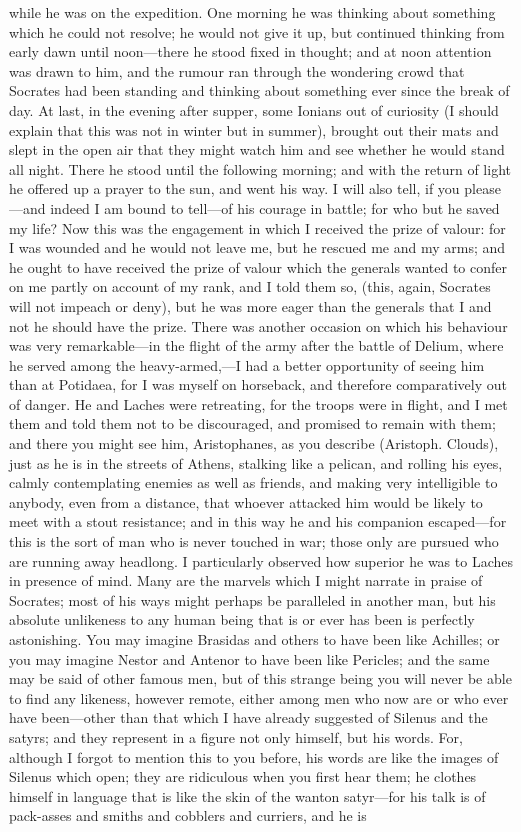 \para[153] while he was on the expedition. One morning he was thinking about something which he could not resolve; he would not give it up, but continued thinking from early dawn until noon---there he stood fixed in thought; and at noon attention was drawn to him, and the rumour ran through the wondering crowd that Socrates had been standing and thinking about something ever since the break of day. At last, in the evening after supper, some Ionians out of curiosity (I should explain that this was not in winter but in summer), brought out their mats and slept in the open air that they might watch him and see whether he would stand all night. There he stood until the following morning; and with the return of light he offered up a prayer to the sun, and went his way. I will also tell, if you please---and indeed I am bound to tell---of his courage in battle; for who but he saved my life? Now this was the engagement in which I received the prize of valour: for I was wounded and he would not leave me, but he rescued me and my arms; and he ought to have received the prize of valour which the generals wanted to confer on me partly on account of my rank, and I told them so, (this, again, Socrates will not impeach or deny), but he was more eager than the generals that I and not he should have the prize. There was another occasion on which his behaviour was very remarkable---in the flight of the army after the battle of Delium, where he served among the heavy-armed,---I had a better opportunity of seeing him than at Potidaea, for I was myself on horseback, and therefore comparatively out of danger. He and Laches were retreating, for the troops were in flight, and I met them and told them not to be discouraged, and promised to remain with them; and there you might see him, Aristophanes, as you describe (Aristoph. Clouds), just as he is in the streets of Athens, stalking like a pelican, and rolling his eyes, calmly contemplating enemies as well as friends, and making very intelligible to anybody, even from a distance, that whoever attacked him would be likely to meet with a stout resistance; and in this way he and his companion escaped---for this is the sort of man who is never touched in war; those only are pursued who are running away headlong. I particularly observed how superior he was to Laches in presence of mind. Many are the marvels which I might narrate in praise of Socrates; most of his ways might perhaps be paralleled in another man, but his absolute unlikeness to any human being that is or ever has been is perfectly astonishing. You may imagine Brasidas and others to have been like Achilles; or you may imagine Nestor and Antenor to have been like Pericles; and the same may be said of other famous men, but of this strange being you will never be able to find any likeness, however remote, either among men who now are or who ever have been---other than that which I have already suggested of Silenus and the satyrs; and they represent in a figure not only himself, but his words. For, although I forgot to mention this to you before, his words are like the images of Silenus which open; they are ridiculous when you first hear them; he clothes himself in language that is like the skin of the wanton satyr---for his talk is of pack-asses and smiths and cobblers and curriers, and he is 
